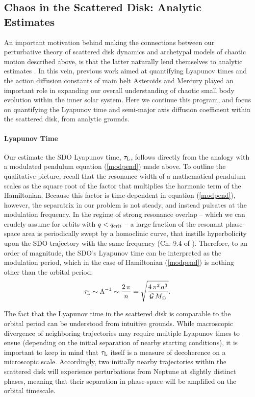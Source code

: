 \documentclass[twocolumn]{aastex62}
\newcommand{\G}{\mathcal{G}}
\newcommand{\Msun}{M_{\odot}}
\begin{document}
\subsection{Chaos in the Scattered Disk: Analytic Estimates} \label{sec:analytic}
An important motivation behind making the connections between our perturbative theory of scattered disk dynamics and archetypal models of chaotic motion described above, is that the latter naturally lend themselves to analytic estimates \citep{LLbook}. In this vein, previous work aimed at quantifying Lyapunov times and the action diffusion constants of main belt Asteroids \citep{1996AJ....112.1278H,1997AJ....114.1246M,1998CeMDA..71..243N} and Mercury \citep{Laskar2008,2011ApJ...739...31L, 2015ApJ...799..120B} played an important role in expanding our overall understanding of chaotic small body evolution within the inner solar system. Here we continue this program, and focus on quantifying the Lyapunov time and semi-major axis diffusion coefficient within the scattered disk, from analytic grounds.  

\paragraph{Lyapunov Time} Our estimate the SDO Lyapunov time, $\tau_{\rm{L}}$, follows directly from the analogy with a modulated pendulum equation (\ref{modpend}) made above. To outline the qualitative picture, recall that the resonance width of a mathematical pendulum scales as the square root of the factor that multiplies the harmonic term of the Hamiltonian. Because this factor is time-dependent in equation (\ref{modpend}), however, the separatrix in our problem is not steady, and instead pulsates at the modulation frequency. In the regime of strong resonance overlap -- which we can crudely assume for orbits with $q< q_{\rm{crit}}$ -- a large fraction of the resonant phase-space area is periodically swept by a homoclinic curve, that instills hyperbolicity upon the SDO trajectory with the same frequency (Ch. 9.4 of \citealt{Morbybook}). Therefore, to an order of magnitude, the SDO's Lyapunov time can be interpreted as the modulation period, which in the case of Hamiltonian (\ref{modpend}) is nothing other than the orbital period:
\begin{align}
\tau_{\rm{L}}\sim\Lambda^{-1}\sim\frac{2\,\pi}{n}=\sqrt{\frac{4\,\pi^2\,a^3}{\G\,\Msun}}.
\label{Lyapana}
\end{align}

The fact that the Lyapunov time in the scattered disk is comparable to the orbital period can be understood from intuitive grounds. While macroscopic divergence of neighboring trajectories may require multiple Lyapunov times to ensue (depending on the initial separation of nearby starting conditions), it is important to keep in mind that $\tau_{\rm{L}}$ itself is a measure of decoherence on a microscopic scale. Accordingly, two initially nearby trajectories within the scattered disk will experience perturbations from Neptune at slightly distinct phases, meaning that their separation in phase-space will be amplified on the orbital timescale.
\end{document}

